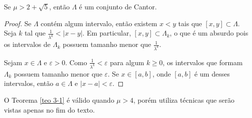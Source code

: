 \begin{theorem}\label{teo 3-1}
Se $\mu > 2 + \sqrt{5}$, então $\Lambda$ é um conjunto de Cantor.
\end{theorem}

\begin{proof}
Se $\Lambda$ contém algum intervalo, então existem $x < y$ tais que $[x, y] \subset \Lambda$.
Seja $k$ tal que $\frac{1}{\lambda^k} < |x - y|$.
Em particular, $[x, y] \subset \Lambda_k$, o que é um absurdo pois os intervalos de $\Lambda_k$ possuem tamanho menor que $\frac{1}{\lambda^k}$.

Sejam $x \in \Lambda$ e $\varepsilon > 0$.
Como $\frac{1}{\lambda^k} < \varepsilon$ para algum $k \geq 0$, os intervalos que formam $\Lambda_k$ possuem tamanho menor que $\varepsilon$.
Se $x \in [a, b]$, onde $[a, b]$ é um desses intervalos, então $a \in \Lambda$ e $|x - a| < \varepsilon$.
\end{proof}

O Teorema \ref{teo 3-1} é válido quando $\mu > 4$, porém utiliza técnicas que serão vistas apenas no fim do texto.
